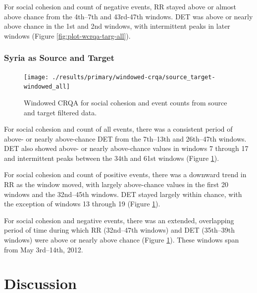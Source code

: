 \documentclass[
  english,
  man]{apa6}
\begin{document}
For social cohesion and count of negative events, RR stayed above or almost
above chance from the 4th--7th and 43rd-47th windows. DET was above or nearly
above chance in the 1st and 2nd windows, with intermittent peaks in later
windows (Figure \ref{fig:plot-wcrqa-targ-all}).

\hypertarget{syria-as-source-and-target-1}{%
\subsubsection{Syria as Source and Target}\label{syria-as-source-and-target-1}}

\begin{figure}
\texttt{[image: ./results/primary/windowed-crqa/source\_target-windowed\_all]} \caption{Windowed CRQA for social cohesion and event counts from source and target filtered data.}\label{fig:plot-wcrqa-source-targ-all}
\end{figure}

For social cohesion and count of all events, there was a consistent period of
above- or nearly above-chance DET from the 7th--13th and 26th--47th windows. DET
also showed above- or nearly above-chance values in windows 7 through 17 and
intermittent peaks between the 34th and 61st windows (Figure
\ref{fig:plot-wcrqa-source-targ-all}).

For social cohesion and count of positive events, there was a downward trend in
RR as the window moved, with largely above-chance values in the first 20 windows
and the 32nd--45th windows. DET stayed largely within chance, with the exception
of windows 13 through 19 (Figure \ref{fig:plot-wcrqa-source-targ-all}).

For social cohesion and negative events, there was an extended, overlapping
period of time during which RR (32nd--47th windows) and DET (35th--39th windows)
were above or nearly above chance (Figure
\ref{fig:plot-wcrqa-source-targ-all}). These windows span from May 3rd--14th,
2012.

\hypertarget{discussion}{%
\section{Discussion}\label{discussion}}
\end{document}
